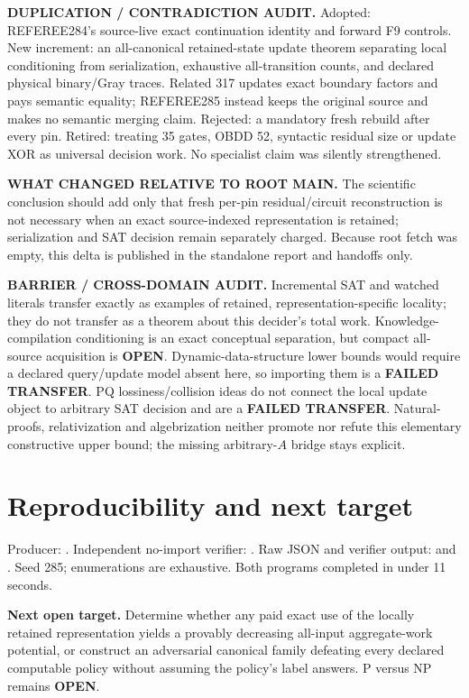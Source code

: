 \documentclass[11pt]{article}
\begin{document}
\noindent\textbf{DUPLICATION / CONTRADICTION AUDIT.} Adopted: REFEREE284's source-live exact continuation identity and forward F9 controls. New increment: an all-canonical retained-state update theorem separating local conditioning from serialization, exhaustive all-transition counts, and declared physical binary/Gray traces. Related 317 updates exact boundary factors and pays semantic equality; REFEREE285 instead keeps the original source and makes no semantic merging claim. Rejected: a mandatory fresh rebuild after every pin. Retired: treating 35 gates, OBDD 52, syntactic residual size or update XOR as universal decision work. No specialist claim was silently strengthened.

\noindent\textbf{WHAT CHANGED RELATIVE TO ROOT MAIN.} The scientific conclusion should add only that fresh per-pin residual/circuit reconstruction is not necessary when an exact source-indexed representation is retained; serialization and SAT decision remain separately charged. Because root fetch was empty, this delta is published in the standalone report and handoffs only.

\noindent\textbf{BARRIER / CROSS-DOMAIN AUDIT.} Incremental SAT and watched literals transfer exactly as examples of retained, representation-specific locality; they do not transfer as a theorem about this decider's total work. Knowledge-compilation conditioning is an exact conceptual separation, but compact all-source acquisition is \textbf{OPEN}. Dynamic-data-structure lower bounds would require a declared query/update model absent here, so importing them is a \textbf{FAILED TRANSFER}. PQ lossiness/collision ideas do not connect the local update object to arbitrary SAT decision and are a \textbf{FAILED TRANSFER}. Natural-proofs, relativization and algebrization neither promote nor refute this elementary constructive upper bound; the missing arbitrary-$A$ bridge stays explicit.

\section{Reproducibility and next target}
Producer: . Independent no-import verifier: . Raw JSON and verifier output:  and . Seed 285; enumerations are exhaustive. Both programs completed in under 11 seconds.

\noindent\textbf{Next open target.} Determine whether any paid exact use of the locally retained representation yields a provably decreasing all-input aggregate-work potential, or construct an adversarial canonical family defeating every declared computable policy without assuming the policy's label answers. P versus NP remains \textbf{OPEN}.
\end{document}
